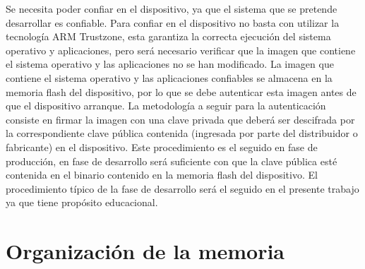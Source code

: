 Se necesita poder confiar en el dispositivo, ya que el sistema que se pretende desarrollar es confiable. Para confiar en el dispositivo no basta con utilizar la tecnología ARM Trustzone, esta garantiza la correcta ejecución del sistema operativo y aplicaciones, pero será necesario verificar que la imagen que contiene el sistema operativo y las aplicaciones no se han modificado. La imagen que contiene el sistema operativo y las aplicaciones confiables se almacena en la memoria flash del dispositivo, por lo que se debe autenticar esta imagen antes de que el dispositivo arranque. La metodología a seguir para la autenticación consiste en firmar la imagen con una clave privada que deberá ser descifrada por la correspondiente clave pública contenida (ingresada por parte del distribuidor o fabricante) en el dispositivo. Este procedimiento es el seguido en fase de producción, en fase de desarrollo será suficiente con que la clave pública esté contenida en el binario contenido en la memoria flash del dispositivo. El procedimiento típico de la fase de desarrollo será el seguido en el presente trabajo ya que tiene propósito educacional.


\section{Organización de la memoria}